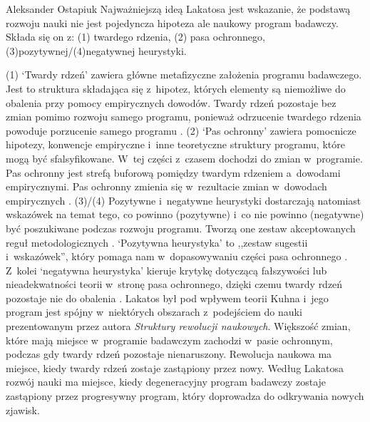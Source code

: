 \begin{artplenv}{Aleksander Ostapiuk}
Najważniejszą ideą Lakatosa jest wskazanie, że podstawą rozwoju nauki nie jest pojedyncza hipoteza ale naukowy program
badawczy. Składa się on z: (1) twardego rdzenia, (2) pasa ochronnego, (3)pozytywnej/(4)negatywnej heurystyki. 

(1) `Twardy rdzeń' zawiera główne metafizyczne założenia programu badawczego. Jest to struktura składająca
się z~hipotez, których elementy są niemożliwe do obalenia przy pomocy empirycznych dowodów. Twardy rdzeń pozostaje bez zmian
pomimo rozwoju samego programu, ponieważ odrzucenie twardego rdzenia powoduje porzucenie samego programu
\parencite[s.~122]{hands_reflection_2001}.
(2) `Pas ochronny' zawiera pomocnicze hipotezy, konwencje
empiryczne i~inne teoretyczne struktury programu, które mogą być sfalsyfikowane. W~tej części z~czasem dochodzi do
zmian w~programie. Pas ochronny jest strefą buforową pomiędzy twardym rdzeniem a~dowodami empirycznymi. Pas ochronny zmienia
się w~rezultacie zmian w~dowodach empirycznych
\parencite[s.~122]{hands_reflection_2001}.
(3)/(4)
Pozytywne i~negatywne heurystyki dostarczają natomiast wskazówek na temat tego, co powinno (pozytywne) i~co nie powinno (negatywne)
być poszukiwane podczas rozwoju programu. Tworzą one zestaw akceptowanych reguł metodologicznych
\parencite[s.~47]{lakatos_falsification_1970}.
`Pozytywna heurystyka' to ,,zestaw sugestii i~wskazówek'', który pomaga
nam w~dopasowywaniu części pasa ochronnego
\parencite[s.~50]{lakatos_falsification_1970}.
Z~kolei `negatywna
heurystyka' kieruje krytykę dotyczącą fałszywości lub nieadekwatności teorii w~stronę pasa ochronnego, dzięki czemu
twardy rdzeń pozostaje nie do obalenia
\parencite[s.~48–50]{lakatos_falsification_1970}.
Lakatos był pod wpływem
teorii Kuhna
\parencite*{kuhn_structure_1962}
i~jego program jest spójny w~niektórych obszarach z~podejściem do nauki
prezentowanym przez autora \textit{Struktury rewolucji naukowych}. Większość zmian, które mają miejsce w~programie
badawczym zachodzi w~pasie ochronnym, podczas gdy twardy rdzeń pozostaje nienaruszony. Rewolucja naukowa ma miejsce,
kiedy twardy rdzeń zostaje zastąpiony przez nowy. Według Lakatosa rozwój nauki ma miejsce, kiedy degeneracyjny program
badawczy zostaje zastąpiony przez progresywny program, który doprowadza do odkrywania nowych zjawisk.


\end{artplenv}
